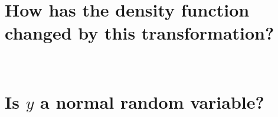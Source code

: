 \documentclass[12pt,letterpaper, onecolumn]{exam}
\begin{document}
\begin{questions}
\begin{parts}
            \part{How has the density function changed by this transformation?}\\
                \solution
            \part{Is $y$ a normal random variable?}\\
                \solution    
        \end{parts}  
\end{questions}
\end{document}
